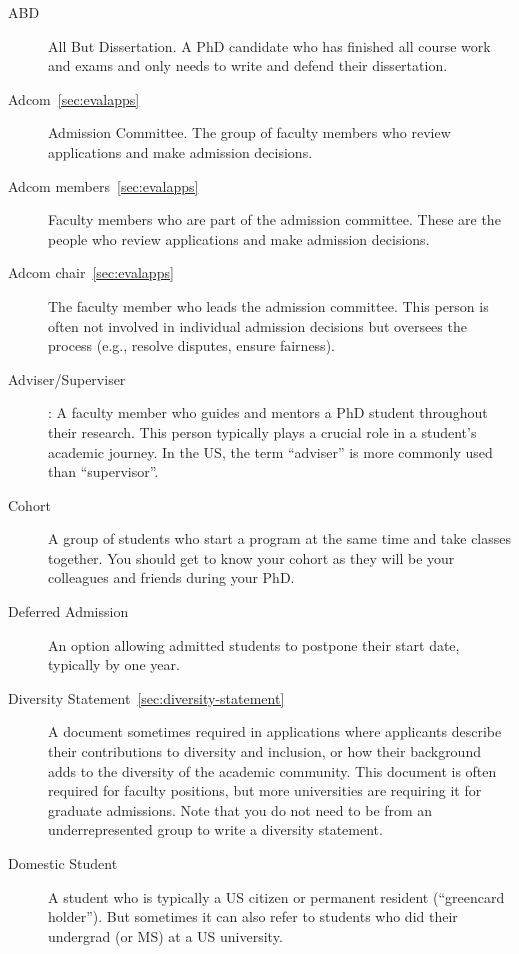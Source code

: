 \documentclass[oneside,11pt,dvipsnames]{book}
\begin{document}
\begin{description}

  \item[ABD] All But Dissertation. A PhD candidate who has finished all course work and exams and only needs to write and defend their dissertation.

  \item[Adcom~\autoref{sec:evalapps}] Admission Committee. The group of faculty members who review applications and make admission decisions.
  
  \item [Adcom members~\autoref{sec:evalapps}] Faculty members who are part of the admission committee. These are the people who review applications and make admission decisions.
  
  \item[Adcom chair~\autoref{sec:evalapps}] The faculty member who leads the admission committee. This person is often not involved in individual admission decisions but oversees the process (e.g., resolve disputes, ensure fairness).
  
  \item[Adviser/Superviser]: A faculty member who guides and mentors a PhD student throughout their research. This person typically plays a crucial role in a student's academic journey. In the US, the term ``adviser'' is more commonly used than ``supervisor''.
  
  \item[Cohort] A group of students who start a program at the same time and take classes together. You should get to know your cohort as they will be your colleagues and friends during your PhD.
  
  \item [Deferred Admission] An option allowing admitted students to postpone their start date, typically by one year.
  
  \item [Diversity Statement~\autoref{sec:diversity-statement}] A document sometimes required in applications where applicants describe their contributions to diversity and inclusion, or how their background adds to the diversity of the academic community. This document is often required for faculty positions, but more universities are requiring it for graduate admissions. Note that you do not need to be from an underrepresented group to write a diversity statement.
  
  \item[Domestic Student] A student who is typically a US citizen or permanent resident (``greencard holder'').
        But sometimes it can also refer to students who did their undergrad (or MS) at a US university.


\end{description}
\end{document}
